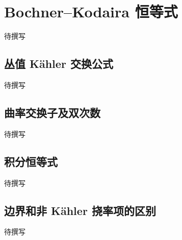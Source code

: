
% 
% 

\section{Bochner–Kodaira 恒等式}
\label{g4:sec:1802}

待撰写

\subsection{丛值 Kähler 交换公式}
\label{g4:subsec:1802:01}
待撰写

\subsection{曲率交换子及双次数}
\label{g4:subsec:1802:02}
待撰写

\subsection{积分恒等式}
\label{g4:subsec:1802:03}
待撰写

\subsection{边界和非 Kähler 挠率项的区别}
\label{g4:subsec:1802:04}
待撰写
